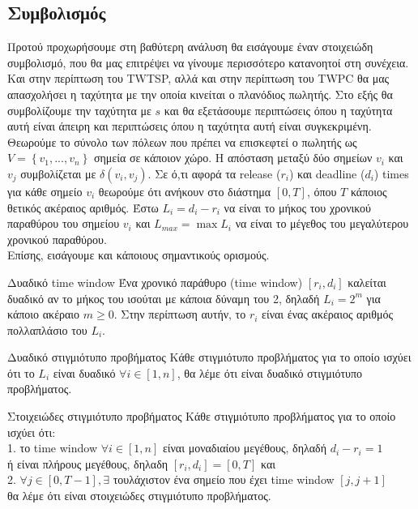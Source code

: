 \documentclass[oneside,12pt]{book}
\theoremstyle{definition}
\begin{document}
\subsection{Συμβολισμός}

Προτού προχωρήσουμε στη βαθύτερη ανάλυση θα εισάγουμε έναν στοιχειώδη συμβολισμό, που θα μας επιτρέψει να γίνουμε περισσότερο κατανοητοί στη συνέχεια. Και στην περίπτωση του TWTSP, αλλά και στην περίπτωση του TWPC θα μας απασχολήσει η ταχύτητα με την οποία κινείται ο πλανόδιος πωλητής. Στο εξής θα συμβολίζουμε την ταχύτητα με \(s\) και θα εξετάσουμε περιπτώσεις όπου η ταχύτητα αυτή είναι άπειρη και περιπτώσεις όπου η ταχύτητα αυτή είναι συγκεκριμένη. Θεωρούμε το σύνολο των πόλεων που πρέπει να επισκεφτεί ο πωλητής ως \(V = \left\{v_1, ..., v_n\right\}\) σημεία σε κάποιον χώρο. Η απόσταση μεταξύ δύο σημείων \(v_i\) και \(v_j\) συμβολίζεται με \(δ(v_i, v_j)\). Σε ό,τι αφορά τα release (\(r_i\)) και deadline (\(d_i\)) times για κάθε σημείο \(v_i\) θεωρούμε ότι ανήκουν στο διάστημα \([0,Τ]\), όπου \(Τ\) κάποιος θετικός ακέραιος αριθμός. Έστω \(L_i = d_i - r_i\) να είναι το μήκος του χρονικού παραθύρου του σημείου \(v_i\) και \(L_{max} = \max L_i\) να είναι το μέγεθος του μεγαλύτερου χρονικού παραθύρου. \\

Επίσης, εισάγουμε και κάποιους σημαντικούς ορισμούς. \\

\begin{mydefinition}{Δυαδικό time window}{}
	Ένα χρονικό παράθυρο (time window) \([r_i, d_i]\) καλείται δυαδικό αν το μήκος του ισούται με κάποια δύναμη του 2, δηλαδή \(L_i = 2^m\) για κάποιο ακέραιο \(m \geq 0\). Στην περίπτωση αυτήν, το \(r_i\) είναι ένας ακέραιος αριθμός πολλαπλάσιο του \(L_i\). 
\end{mydefinition}

\begin{mydefinition}{Δυαδικό στιγμιότυπο προβήματος}{}
	Κάθε στιγμιότυπο προβλήματος για το οποίο ισχύει ότι το \(L_i\) είναι δυαδικό \(\forall i \in [1,n]\), θα λέμε ότι είναι δυαδικό στιγμιότυπο προβλήματος. 
\end{mydefinition}

\begin{mydefinition}{Στοιχειώδες στιγμιότυπο προβήματος}{}
	Κάθε στιγμιότυπο προβλήματος για το οποίο ισχύει ότι: \\
	1. το time window \(\forall i \in [1,n]\) είναι μοναδιαίου μεγέθους, δηλαδή \( d_i - r_i = 1 \) \\
	ή είναι πλήρους μεγέθους, δηλαδη \([r_i, d_i] = [0,T]\) και \\
	2. \(\forall j \in [0,T-1], \exists\) τουλάχιστον ένα σημείο που έχει time window \([j, j+1]\) \\
	θα λέμε ότι είναι στοιχειώδες στιγμιότυπο προβλήματος. 
\end{mydefinition}
\end{document}
